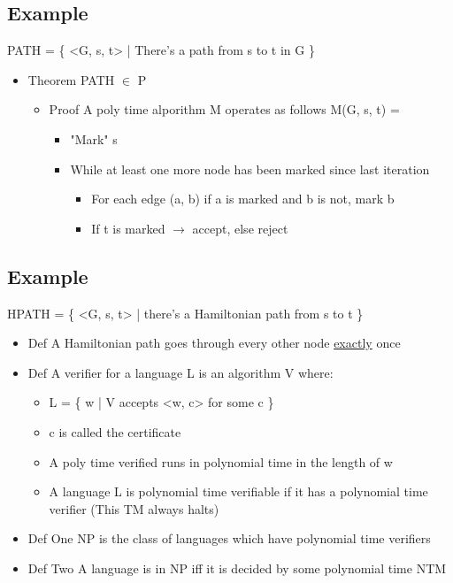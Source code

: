 \documentclass[11pt]{article}
\begin{document}
\subsection{Example}
\label{sec:org1a1994f}
PATH = \{ <G, s, t> | There's a path from s to t in G \}
\begin{itemize}
\item Theorem
PATH \(\in\) P 
\begin{itemize}
\item Proof
A poly time alporithm M operates as follows
M(G, s, t) = 
\begin{itemize}
\item "Mark" s
\item While at least one more node has been marked since last iteration
\begin{itemize}
\item For each edge (a, b) if a is marked and b is not, mark b
\end{itemize}
\begin{itemize}
\item If t is marked \(\rightarrow\) accept, else reject
\end{itemize}
\end{itemize}
\end{itemize}
\end{itemize}
\subsection{Example}
\label{sec:orgd05e00f}
HPATH = \{ <G, s, t> | there's a Hamiltonian path from s to t \}
\begin{itemize}
\item Def
A Hamiltonian path goes through every other node \uline{exactly} once
\item Def
A verifier for a language L is an algorithm V where:
\begin{itemize}
\item L = \{ w | V accepts <w, c> for some c \}
\item c is called the certificate
\item A poly time verified runs in polynomial time in the length of w
\item A language L is polynomial time verifiable if it has a polynomial time verifier (This TM always halts)
\end{itemize}
\item Def One
NP is the class of languages which have polynomial time verifiers
\item Def Two
A language is in NP iff it is decided by some polynomial time NTM
\end{itemize}
\end{document}
